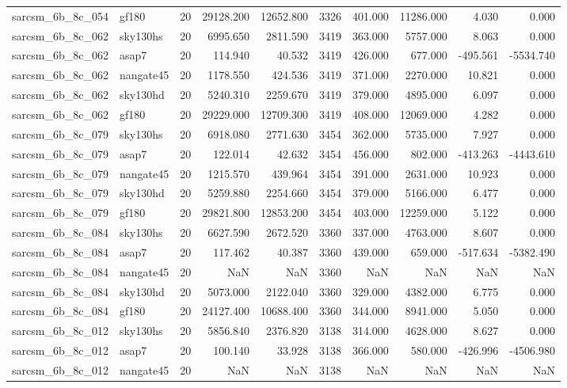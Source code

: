 \begin{longtable}{llrrrrrrrr}
sarcsm\_6b\_8c\_054 & gf180 & 20 & 29128.200 & 12652.800 & 3326 & 401.000 & 11286.000 & 4.030 & 0.000 \\
sarcsm\_6b\_8c\_062 & sky130hs & 20 & 6995.650 & 2811.590 & 3419 & 363.000 & 5757.000 & 8.063 & 0.000 \\
sarcsm\_6b\_8c\_062 & asap7 & 20 & 114.940 & 40.532 & 3419 & 426.000 & 677.000 & -495.561 & -5534.740 \\
sarcsm\_6b\_8c\_062 & nangate45 & 20 & 1178.550 & 424.536 & 3419 & 371.000 & 2270.000 & 10.821 & 0.000 \\
sarcsm\_6b\_8c\_062 & sky130hd & 20 & 5240.310 & 2259.670 & 3419 & 379.000 & 4895.000 & 6.097 & 0.000 \\
sarcsm\_6b\_8c\_062 & gf180 & 20 & 29229.000 & 12709.300 & 3419 & 408.000 & 12069.000 & 4.282 & 0.000 \\
sarcsm\_6b\_8c\_079 & sky130hs & 20 & 6918.080 & 2771.630 & 3454 & 362.000 & 5735.000 & 7.927 & 0.000 \\
sarcsm\_6b\_8c\_079 & asap7 & 20 & 122.014 & 42.632 & 3454 & 456.000 & 802.000 & -413.263 & -4443.610 \\
sarcsm\_6b\_8c\_079 & nangate45 & 20 & 1215.570 & 439.964 & 3454 & 391.000 & 2631.000 & 10.923 & 0.000 \\
sarcsm\_6b\_8c\_079 & sky130hd & 20 & 5259.880 & 2254.660 & 3454 & 379.000 & 5166.000 & 6.477 & 0.000 \\
sarcsm\_6b\_8c\_079 & gf180 & 20 & 29821.800 & 12853.200 & 3454 & 403.000 & 12259.000 & 5.122 & 0.000 \\
sarcsm\_6b\_8c\_084 & sky130hs & 20 & 6627.590 & 2672.520 & 3360 & 337.000 & 4763.000 & 8.607 & 0.000 \\
sarcsm\_6b\_8c\_084 & asap7 & 20 & 117.462 & 40.387 & 3360 & 439.000 & 659.000 & -517.634 & -5382.490 \\
sarcsm\_6b\_8c\_084 & nangate45 & 20 & NaN & NaN & 3360 & NaN & NaN & NaN & NaN \\
sarcsm\_6b\_8c\_084 & sky130hd & 20 & 5073.000 & 2122.040 & 3360 & 329.000 & 4382.000 & 6.775 & 0.000 \\
sarcsm\_6b\_8c\_084 & gf180 & 20 & 24127.400 & 10688.400 & 3360 & 344.000 & 8941.000 & 5.050 & 0.000 \\
sarcsm\_6b\_8c\_012 & sky130hs & 20 & 5856.840 & 2376.820 & 3138 & 314.000 & 4628.000 & 8.627 & 0.000 \\
sarcsm\_6b\_8c\_012 & asap7 & 20 & 100.140 & 33.928 & 3138 & 366.000 & 580.000 & -426.996 & -4506.980 \\
sarcsm\_6b\_8c\_012 & nangate45 & 20 & NaN & NaN & 3138 & NaN & NaN & NaN & NaN \\

\end{longtable}
